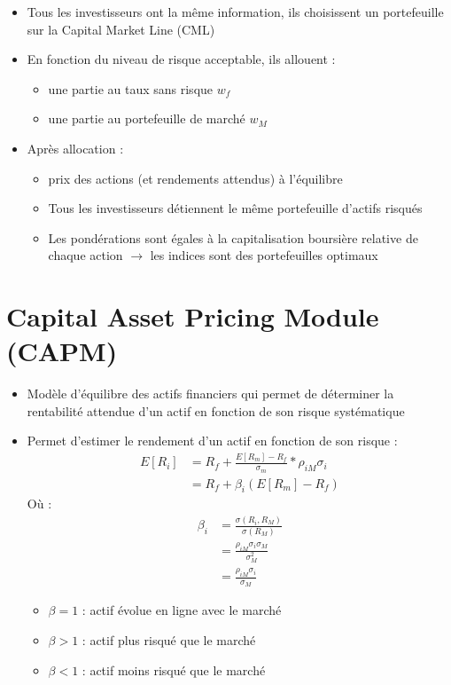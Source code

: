 \begin{itemize}
    \item Tous les investisseurs ont la même information, ils choisissent un portefeuille sur la Capital Market Line (CML)
    \item En fonction du niveau de risque acceptable, ils allouent :
    \begin{itemize}
        \item une partie au taux sans risque $w_f$
        \item une partie au portefeuille de marché $w_M$
    \end{itemize}
    \item Après allocation :
    \begin{itemize}
        \item prix des actions (et rendements attendus) à l'équilibre
        \item Tous les investisseurs détiennent le même portefeuille d'actifs risqués
        \item Les pondérations sont égales à la capitalisation boursière relative de chaque action $\rightarrow$ les indices sont des portefeuilles optimaux
    \end{itemize}
\end{itemize}

\section{Capital Asset Pricing Module (CAPM)}

\begin{itemize}
    \item Modèle d'équilibre des actifs financiers qui permet de déterminer la rentabilité attendue d'un actif en fonction de son risque systématique
    \item Permet d'estimer le rendement d'un actif en fonction de son risque :
    \begin{align*}
        E[R_i] &= R_f + \frac{E[R_m] - R_f}{\sigma_m} * \rho_{iM} \sigma_i \\
               &= R_f + \beta_i (E[R_m] - R_f)
    \end{align*}
    Où :
    \begin{align*}
    \beta_i &= \frac{\sigma(R_i, R_M)}{\sigma(R_M)} \\
            &= \frac{\rho_{iM} \sigma_i \sigma_M}{\sigma^2_M} \\
            &= \frac{\rho_{iM} \sigma_i}{\sigma_M}
    \end{align*}
    \begin{itemize}
        \item $\beta = 1$ : actif évolue en ligne avec le marché
        \item $\beta > 1$ : actif plus risqué que le marché
        \item $\beta < 1$ : actif moins risqué que le marché
    \end{itemize}
\end{itemize}

